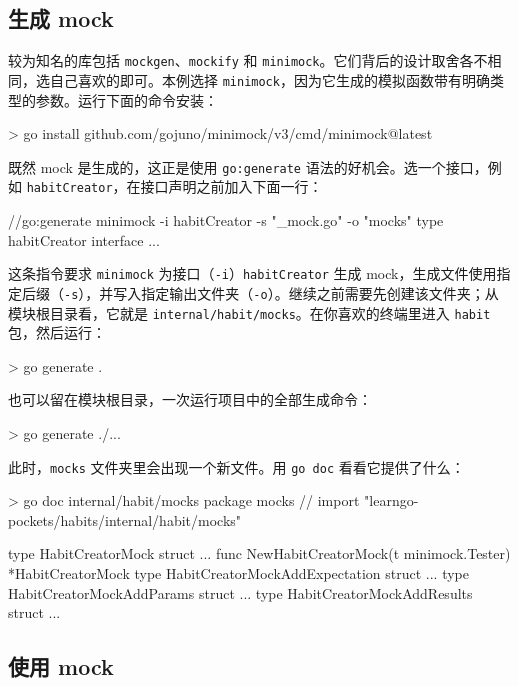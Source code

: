 \subsection{生成 mock}

较为知名的库包括 \texttt{mockgen}、\texttt{mockify} 和 \texttt{minimock}。它们背后的设计取舍各不相同，选自己喜欢的即可。本例选择 \texttt{minimock}，因为它生成的模拟函数带有明确类型的参数。运行下面的命令安装：

\begin{shellcode}[]
> go install github.com/gojuno/minimock/v3/cmd/minimock@latest
\end{shellcode}

既然 mock 是生成的，这正是使用 \texttt{go:generate} 语法的好机会。选一个接口，例如 \texttt{habitCreator}，在接口声明之前加入下面一行：

\begin{gocode}[]
//go:generate minimock -i habitCreator -s "_mock.go" -o "mocks"
type habitCreator interface {
    ...
}
\end{gocode}

这条指令要求 \texttt{minimock} 为接口（\texttt{-i}）\texttt{habitCreator} 生成 mock，生成文件使用指定后缀（\texttt{-s}），并写入指定输出文件夹（\texttt{-o}）。继续之前需要先创建该文件夹；从模块根目录看，它就是 \texttt{internal/habit/mocks}。在你喜欢的终端里进入 \texttt{habit} 包，然后运行：

\begin{shellcode}[]
> go generate .
\end{shellcode}

也可以留在模块根目录，一次运行项目中的全部生成命令：

\begin{shellcode}[]
> go generate ./...
\end{shellcode}

此时，\texttt{mocks} 文件夹里会出现一个新文件。用 \texttt{go doc} 看看它提供了什么：

\begin{shellcode}[]
> go doc internal/habit/mocks
package mocks // import "learngo-pockets/habits/internal/habit/mocks"

type HabitCreatorMock struct{ ... }
    func NewHabitCreatorMock(t minimock.Tester) *HabitCreatorMock
type HabitCreatorMockAddExpectation struct{ ... }
type HabitCreatorMockAddParams struct{ ... }
type HabitCreatorMockAddResults struct{ ... }
\end{shellcode}

\subsection{使用 mock}

